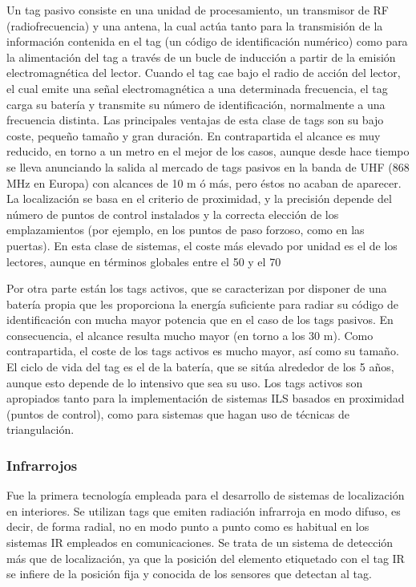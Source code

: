 Un tag pasivo consiste en una unidad de procesamiento, un transmisor de RF (radiofrecuencia)
y una antena, la cual actúa tanto para la transmisión de la información contenida en el tag (un código de identificación
numérico) como para la alimentación del tag a través de un bucle de inducción a partir de la emisión electromagnética del lector. Cuando el tag cae bajo el radio de acción del lector, el cual emite una señal electromagnética a una determinada frecuencia, el tag carga su batería y transmite su número de identificación, normalmente a una frecuencia distinta. Las principales ventajas de esta clase de tags son su bajo coste, pequeño tamaño y gran duración. En contrapartida el alcance es muy reducido, en torno a un metro en el mejor de los casos, aunque desde hace tiempo se lleva anunciando la salida al mercado de tags pasivos en la banda de UHF (868 MHz en Europa) con alcances de 10 m ó más, pero éstos no acaban de aparecer. La localización se basa en el criterio de proximidad, y la precisión depende del número de puntos de control instalados y la correcta elección de los emplazamientos (por ejemplo, en los puntos de paso forzoso, como en las puertas). En esta clase de sistemas, el coste más elevado por unidad es el de los lectores, aunque en términos globales entre el 50 y el 70%

Por otra parte están los tags activos, que se caracterizan por disponer de una batería propia que les proporciona la energía suficiente para radiar su código de identificación con mucha mayor potencia que en el caso de los tags pasivos. En consecuencia, el alcance resulta mucho mayor (en torno a los 30 m). Como contrapartida, el coste de los tags activos es mucho mayor, así como su tamaño. El ciclo de vida del tag es el de la batería, que se sitúa alrededor de los 5 años, aunque esto depende de lo intensivo que sea su uso. Los tags activos son apropiados tanto para la implementación de sistemas ILS basados en proximidad (puntos de control), como para sistemas que hagan uso de técnicas de triangulación. 

\subsubsection{Infrarrojos}

Fue la primera tecnología empleada para el desarrollo de sistemas de localización en interiores. Se utilizan tags que emiten radiación infrarroja en modo difuso, es decir, de forma radial, no en modo punto a punto como es habitual en los sistemas IR empleados en comunicaciones. Se trata de un sistema de detección más que de localización, ya que la posición del elemento etiquetado con el tag IR se infiere de la posición fija y conocida de los sensores que detectan al tag. 

